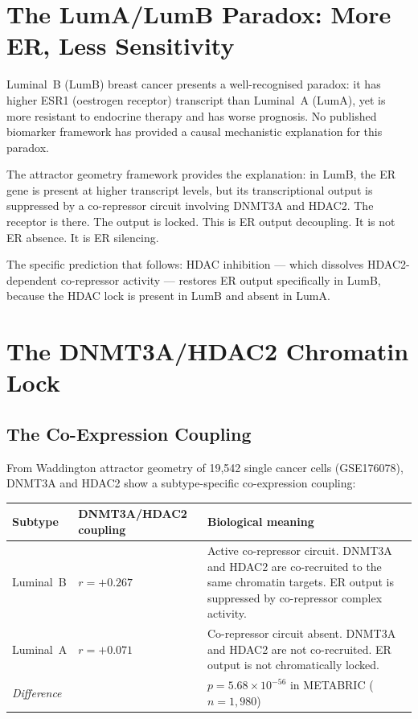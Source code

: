 \documentclass[12pt, a4paper]{article}
\begin{document}
\section{The LumA/LumB Paradox: More ER,
Less Sensitivity}

Luminal~B (LumB) breast cancer presents a
well-recognised paradox: it has higher ESR1
(oestrogen receptor) transcript than Luminal~A
(LumA), yet is more resistant to endocrine
therapy and has worse prognosis. No published
biomarker framework has provided a causal
mechanistic explanation for this paradox.

The attractor geometry framework provides the
explanation: in LumB, the ER gene is present at
higher transcript levels, but its transcriptional
output is suppressed by a co-repressor circuit
involving DNMT3A and HDAC2. The receptor is there.
The output is locked. This is ER output decoupling.
It is not ER absence. It is ER silencing.

The specific prediction that follows: HDAC
inhibition --- which dissolves HDAC2-dependent
co-repressor activity --- restores ER output
specifically in LumB, because the HDAC lock is
present in LumB and absent in LumA.

\section{The DNMT3A/HDAC2 Chromatin Lock}

\subsection{The Co-Expression Coupling}

From Waddington attractor geometry of 19,542
single cancer cells (GSE176078), DNMT3A and HDAC2
show a subtype-specific co-expression coupling:

\begin{center}
\begin{tabular}{p{3cm}p{3cm}p{5.5cm}}
\toprule
\textbf{Subtype} &
\textbf{DNMT3A/HDAC2 coupling} &
\textbf{Biological meaning} \\
\midrule
Luminal~B &
$r = +0.267$ &
Active co-repressor circuit. DNMT3A and
HDAC2 are co-recruited to the same
chromatin targets. ER output is suppressed
by co-repressor complex activity. \\[0.5em]
Luminal~A &
$r = +0.071$ &
Co-repressor circuit absent. DNMT3A and
HDAC2 are not co-recruited. ER output
is not chromatically locked. \\
\midrule
\multicolumn{2}{l}{\textit{Difference}} &
$p = 5.68\times10^{-56}$ in METABRIC
($n=1{,}980$) \\
\bottomrule
\end{tabular}
\end{center}
\end{document}
